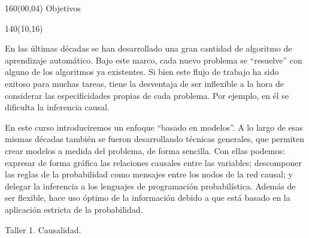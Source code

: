 \documentclass[shownotes,aspectratio=169]{beamer}
\begin{document}
\begin{frame}

\begin{textblock}{160}(00,04)\centering
\textcolor{black!85}{\Large Objetivos}
\end{textblock}

\begin{textblock}{140}(10,16)

\normalsize

\parbox{14cm}{En las últimas décadas se han desarrollado una gran cantidad de algoritmo de aprendizaje automático.
Bajo este marco, cada nuevo problema se ``resuelve'' con alguno de los algoritmos ya existentes.
Si bien este flujo de trabajo ha sido exitoso para muchas tareas, tiene la desventaja de ser inflexible a la hora de considerar las especificidades propias de cada problema.
Por ejemplo, en él se dificulta la inferencia causal.

\vspace{0.3cm}

En este curso introduciremos un enfoque ``basado en modelos''.
A lo largo de esas mismas décadas también se fueron desarrollando técnicas generales, que permiten crear modelos a medida del problema, de forma sencilla.
Con ellas podemos: expresar de forma gráfica las relaciones causales entre las variables; descomponer las reglas de la probabilidad como mensajes entre los nodos de la red causal; y delegar la inferencia a los lenguajes de programación probabilística.
Además de ser flexible, hace uso óptimo de la información debido a que está basado en la aplicación estricta de la probabilidad.
}
\end{textblock}
\end{frame}


\begin{frame}

\centering \LARGE
Taller 1. Causalidad.

\end{frame}
\end{document}
